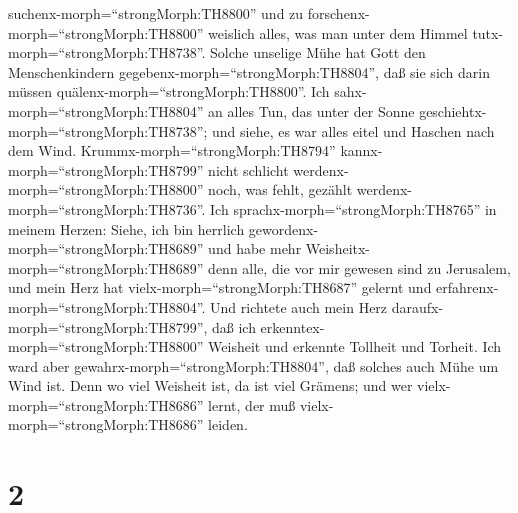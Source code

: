 suchenx-morph=``strongMorph:TH8800'' und zu
forschenx-morph=``strongMorph:TH8800'' weislich alles, was man unter dem
Himmel tutx-morph=``strongMorph:TH8738''. Solche unselige Mühe hat Gott
den Menschenkindern gegebenx-morph=``strongMorph:TH8804'', daß sie sich
darin müssen quälenx-morph=``strongMorph:TH8800''.  Ich
sahx-morph=``strongMorph:TH8804'' an alles Tun, das unter der Sonne
geschiehtx-morph=``strongMorph:TH8738''; und siehe, es war alles eitel
und Haschen nach dem Wind. 
Krummx-morph=``strongMorph:TH8794'' kannx-morph=``strongMorph:TH8799''
nicht schlicht werdenx-morph=``strongMorph:TH8800'' noch, was fehlt,
gezählt werdenx-morph=``strongMorph:TH8736''.  Ich
sprachx-morph=``strongMorph:TH8765'' in meinem Herzen: Siehe, ich bin
herrlich gewordenx-morph=``strongMorph:TH8689'' und habe mehr
Weisheitx-morph=``strongMorph:TH8689'' denn alle, die vor mir gewesen
sind zu Jerusalem, und mein Herz hat vielx-morph=``strongMorph:TH8687''
gelernt und erfahrenx-morph=``strongMorph:TH8804''.  Und
richtete auch mein Herz daraufx-morph=``strongMorph:TH8799'', daß ich
erkenntex-morph=``strongMorph:TH8800'' Weisheit und erkennte Tollheit
und Torheit. Ich ward aber gewahrx-morph=``strongMorph:TH8804'', daß
solches auch Mühe um Wind ist.  Denn wo viel Weisheit ist,
da ist viel Grämens; und wer vielx-morph=``strongMorph:TH8686'' lernt,
der muß vielx-morph=``strongMorph:TH8686'' leiden.

\hypertarget{section-1}{%
\section{2}\label{section-1}}

